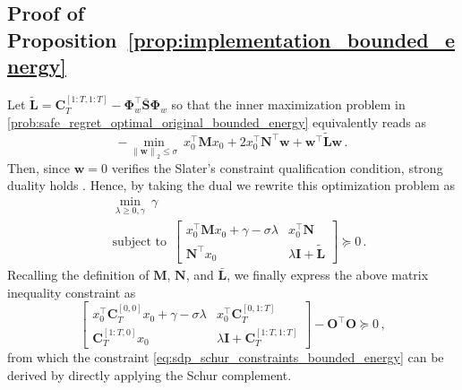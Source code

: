 \documentclass[conference]{IEEEtran}
\DeclareMathOperator*{\st}{subject~to}
\newcommand{\norm}[1]{\left\lVert#1\right\rVert}
\begin{document}
\subsection{Proof of Proposition~\ref{prop:implementation_bounded_energy}}
    Let $\tilde{\mathbf{L}} = \mathbf{C}_T^{[1:T, 1:T]} - \bm{\Phi}_w^\top \bar{\mathbf{S}} \bm{\Phi}_w$ so that the inner maximization problem in \eqref{prob:safe_regret_optimal_original_bounded_energy} equivalently reads as
    \begin{equation*}
        - \min_{\norm{\mathbf{w}}_2 \leq \sigma} ~ x_0^\top \mathbf{M} x_0 + 2x_0^\top \mathbf{N}^\top \mathbf{w} + \mathbf{w}^\top \tilde{\mathbf{L}} \mathbf{w}\,.
    \end{equation*}
    Then, since $\mathbf{w} = 0$ verifies the Slater's constraint qualification condition, strong duality holds \cite[App. B]{boyd2004convex}. Hence, by taking the dual we rewrite this optimization problem as
    \begin{align*}
        & ~ \min_{\lambda \geq 0, \gamma} ~ \gamma\\
        & \st ~
        \begin{bmatrix}
            x_0^\top \mathbf{M} x_0 + \gamma - \sigma \lambda & x_0^\top \mathbf{N}\\
            \mathbf{N}^\top x_0 & \lambda \mathbf{I} + \tilde{\mathbf{L}}
        \end{bmatrix} \succeq 0\,.
    \end{align*}
    Recalling the definition of $\mathbf{M}$, $\mathbf{N}$, and $\bar{\mathbf{L}}$, we finally express the above matrix inequality constraint as
    \begin{equation*}
        \begin{bmatrix}
            x_0^\top \mathbf{C}_T^{[0,0]} x_0 + \gamma - \sigma \lambda & x_0^\top \mathbf{C}_T^{[0, 1:T]} \\
            \mathbf{C}_T^{[1:T, 0]} x_0 & \lambda \mathbf{I} + \mathbf{C}_T^{[1:T, 1:T]}
        \end{bmatrix}
        -
        \mathbf{O}^\top \mathbf{O}
        \succeq 0\,,
    \end{equation*}
    from which the constraint \eqref{eq:sdp_schur_constraints_bounded_energy} can be derived by directly applying the Schur complement.
\end{document}
